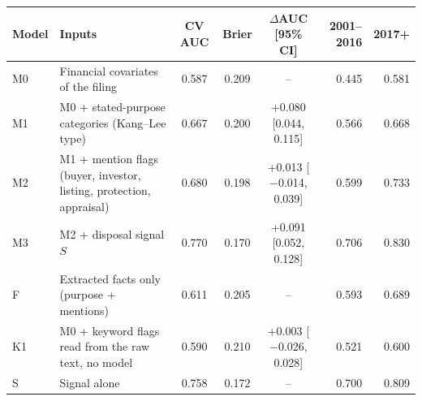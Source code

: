 \begin{tabular}{l>{\raggedright\arraybackslash}p{6.0cm}cccrr}
\toprule
Model & Inputs & CV AUC & Brier & $\Delta$AUC [95\% CI] & 2001--2016 & 2017+ \\
\midrule
M0 & Financial covariates of the filing & 0.587 & 0.209 & -- & 0.445 & 0.581 \\
M1 & M0 + stated-purpose categories (Kang--Lee type) & 0.667 & 0.200 & +0.080 [0.044, 0.115] & 0.566 & 0.668 \\
M2 & M1 + mention flags (buyer, investor, listing, protection, appraisal) & 0.680 & 0.198 & +0.013 [$-$0.014, 0.039] & 0.599 & 0.733 \\
M3 & M2 + disposal signal $S$ & 0.770 & 0.170 & +0.091 [0.052, 0.128] & 0.706 & 0.830 \\
F & Extracted facts only (purpose + mentions) & 0.611 & 0.205 & -- & 0.593 & 0.689 \\
K1 & M0 + keyword flags read from the raw text, no model & 0.590 & 0.210 & +0.003 [$-$0.026, 0.028] & 0.521 & 0.600 \\
S & Signal alone & 0.758 & 0.172 & -- & 0.700 & 0.809 \\
\bottomrule
\end{tabular}
